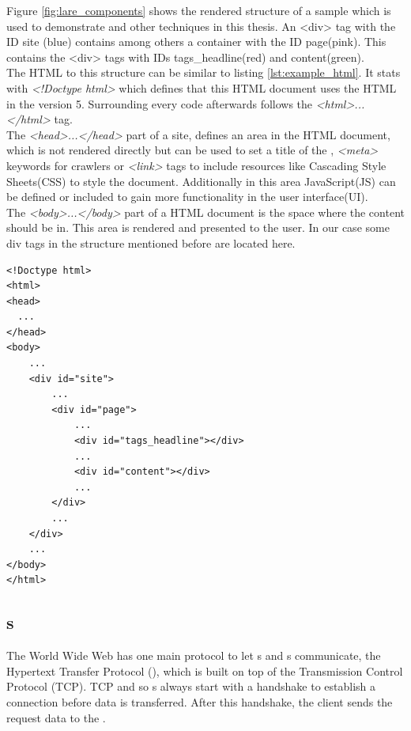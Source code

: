 \noindent{}Figure \ref{fig:lare_components} shows the rendered structure of a sample \webApplication{} which is used to demonstrate \lare{} and other techniques in this thesis.
An <div> tag with the ID site (blue) contains among others a container with the ID page(pink).
This contains the <div> tags with IDs tags\_headline(red) and content(green).
\\
The HTML to this structure can be similar to listing \ref{lst:example_html}. It stats with \emph{<!Doctype html>} which defines that this HTML document uses the HTML in the version 5.
Surrounding every code afterwards follows the \emph{<html>...</html>} tag.
\\
The \emph{<head>...</head>} part of a site, defines an area in the HTML document, which is not rendered directly but can be used to set a title of the \webPage{}, \emph{<meta>} keywords for crawlers or \emph{<link>} tags to include resources like Cascading Style Sheets(CSS) to style the document.
Additionally in this area JavaScript(JS) can be defined or included to gain more functionality in the user interface(UI).
\\
The \emph{<body>...</body>} part of a HTML document is the space where the content should be in.
This area is rendered and presented to the user.
In our case some div tags in the structure mentioned before are located here.

\begin{minipage}[c]{0.95\linewidth}
\begin{lstlisting}[caption=Sample HTML document, label=lst:example_html]
<!Doctype html>
<html>
<head>
  ...
</head>
<body>
    ...
    <div id="site">
        ...
        <div id="page">
            ...
            <div id="tags_headline"></div>
            ...
            <div id="content"></div>
            ...
        </div>
        ...
    </div>
    ...
</body>
</html>
\end{lstlisting}
\end{minipage}

\subsection{\httpRequest{}s\label{httpRequest}}
The World Wide Web has one main protocol to let \webBrowser{}s and \webServer{}s communicate, the Hypertext Transfer Protocol (\http{}), which is built on top of the Transmission Control Protocol (TCP).
TCP and so \httpRequest{}s always start with a handshake to establish a connection before data is transferred.
After this handshake, the client sends the request data to the \webServer{}.

